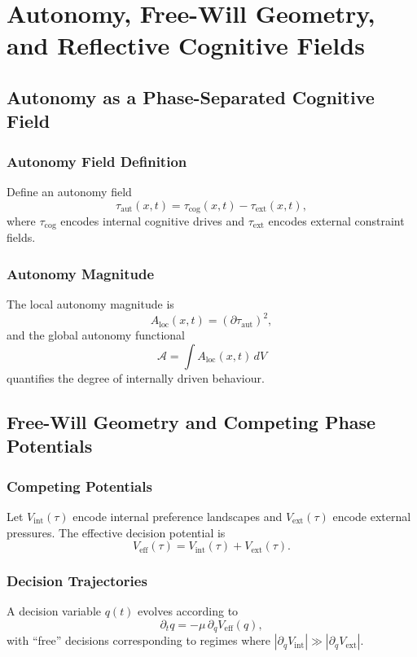 

\part{Autonomy, Free-Will Geometry, and Reflective Cognitive Fields}

\chapter{Autonomy as a Phase-Separated Cognitive Field}

\section{Autonomy Field Definition}
Define an autonomy field
\[
\tau_{\mathrm{aut}}(x,t) = \tau_{\mathrm{cog}}(x,t) - \tau_{\mathrm{ext}}(x,t),
\]
where \(\tau_{\mathrm{cog}}\) encodes internal cognitive drives and \(\tau_{\mathrm{ext}}\) encodes external constraint fields.

\section{Autonomy Magnitude}
The local autonomy magnitude is
\[
A_{\mathrm{loc}}(x,t) = (\partial\tau_{\mathrm{aut}})^2,
\]
and the global autonomy functional
\[
\mathcal{A} = \int A_{\mathrm{loc}}(x,t)\, dV
\]
quantifies the degree of internally driven behaviour.

\chapter{Free-Will Geometry and Competing Phase Potentials}

\section{Competing Potentials}
Let \(V_{\mathrm{int}}(\tau)\) encode internal preference landscapes and \(V_{\mathrm{ext}}(\tau)\) encode external pressures.
The effective decision potential is
\[
V_{\mathrm{eff}}(\tau) = V_{\mathrm{int}}(\tau) + V_{\mathrm{ext}}(\tau).
\]

\section{Decision Trajectories}
A decision variable \(q(t)\) evolves according to
\[
\partial_t q = -\mu\,\partial_q V_{\mathrm{eff}}(q),
\]
with “free” decisions corresponding to regimes where \(|\partial_q V_{\mathrm{int}}| \gg |\partial_q V_{\mathrm{ext}}|\).

